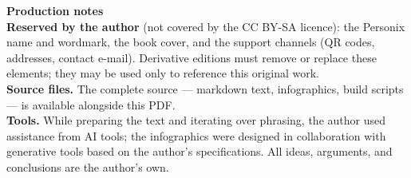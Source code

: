 \clearpage
\thispagestyle{empty}
\begin{flushleft}\small\sffamily
\textbf{Production notes}\\[1.2em]

\textbf{Reserved by the author} (not covered by the CC BY-SA licence): the
Personix name and wordmark, the book cover, and the support channels (QR
codes, addresses, contact e-mail). Derivative editions must remove or replace
these elements; they may be used only to reference this original work.\\[1.2em]

\textbf{Source files.} The complete source --- markdown text, infographics,
build scripts --- is available alongside this PDF.\\[1.2em]

\textbf{Tools.} While preparing the text and iterating over phrasing, the
author used assistance from AI tools; the infographics were designed
in collaboration with generative tools based on the author's specifications.
All ideas, arguments, and conclusions are the author's own.
\end{flushleft}
\clearpage
